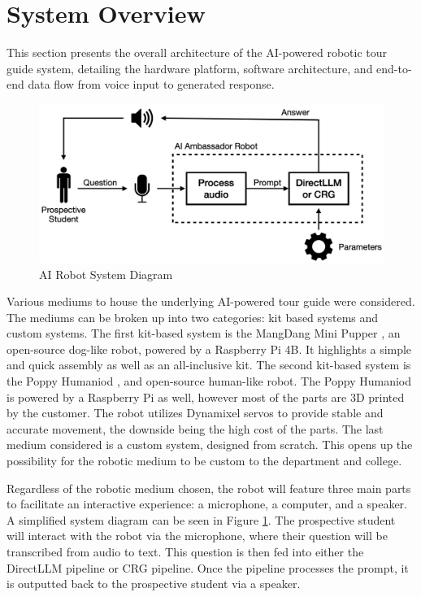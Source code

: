 \documentclass[conference]{IEEEtran}
\begin{document}
\section{System Overview}
This section presents the overall architecture of the AI-powered robotic tour guide system, detailing the hardware platform,
software architecture, and end-to-end data flow from voice input to generated response.

\begin{figure}[t]
    \centering
    \includegraphics[width=0.70\linewidth]{assets/system_diagram.png}
    \caption{AI Robot System Diagram}
    \label{fig:system}
\end{figure}

Various mediums to house the underlying AI-powered tour guide were considered. The mediums can be broken up into two categories: kit based systems and custom systems.
The first kit-based system is the MangDang Mini Pupper \cite{b1}, an open-source dog-like robot, powered by a Raspberry Pi 4B. It highlights a simple and quick assembly as well as an all-inclusive kit. 
The second kit-based system is the Poppy Humaniod \cite{b6}, and open-source human-like robot. The Poppy Humaniod is powered by a Raspberry Pi as well, however most of the parts are 3D printed by the customer. The robot utilizes Dynamixel servos to provide stable and accurate movement, the downside being the high cost of the parts.
The last medium considered is a custom system, designed from scratch. This opens up the possibility for the robotic medium to be custom to the department and college. 

Regardless of the robotic medium chosen, the robot will feature three main parts to facilitate an interactive experience: a microphone, a computer, and a speaker. 
A simplified system diagram can be seen in Figure \ref{fig:system}. The prospective student will interact with the robot via the microphone, where their question will be transcribed from audio to text.
This question is then fed into either the DirectLLM pipeline or CRG pipeline. Once the pipeline processes the prompt, it is outputted back to the prospective student via a speaker.
\end{document}
